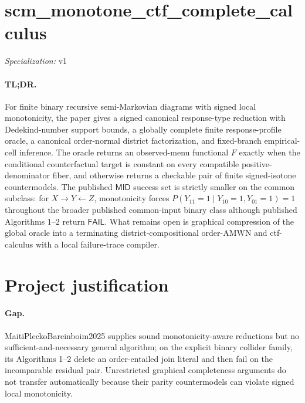 \documentclass{article}
\begin{document}
\sloppy

\section*{scm\_\allowbreak{}monotone\_\allowbreak{}ctf\_\allowbreak{}complete\_\allowbreak{}calculus}

\noindent\textit{Specialization:} v1\par

\paragraph{TL;DR.} For finite binary recursive semi-Markovian diagrams with signed local monotonicity, the paper gives a signed canonical response-type reduction with Dedekind-number support bounds, a globally complete finite response-profile oracle, a canonical order-normal district factorization, and fixed-branch empirical-cell inference.  The oracle returns an observed-menu functional \(F\) exactly when the conditional counterfactual target is constant on every compatible positive-denominator fiber, and otherwise returns a checkable pair of finite signed-isotone countermodels.  The published \(\mathsf{MID}\) success set is strictly smaller on the common subclass: for \(X\to Y\leftarrow Z\), monotonicity forces \(P(Y_{11}=1\mid Y_{10}=1,Y_{01}=1)=1\) throughout the broader published common-input binary class although published Algorithms 1--2 return \(\mathsf{FAIL}\).  What remains open is graphical compression of the global oracle into a terminating district-compositional order-AMWN and ctf-calculus with a local failure-trace compiler.

\section{Project justification}

\paragraph{Gap.} MaitiPleckoBareinboim2025 supplies sound monotonicity-aware reductions but no sufficient-and-necessary general algorithm; on the explicit binary collider family, its Algorithms 1--2 delete an order-entailed join literal and then fail on the incomparable residual pair.  Unrestricted graphical completeness arguments do not transfer automatically because their parity countermodels can violate signed local monotonicity.
\end{document}
